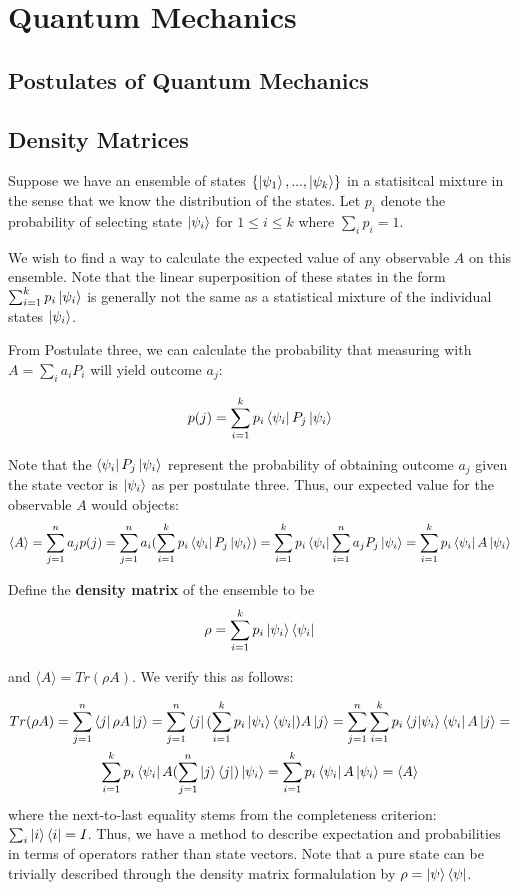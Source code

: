 \documentclass{../quantum.tex}
\begin{document}
\section{Quantum Mechanics}

\subsection{Postulates of Quantum Mechanics}

\subsection{Density Matrices}

Suppose we have an ensemble of states $\{\ket{\psi_1},...,\ket{\psi_k}\}$ in a statisitcal mixture in the sense that we know the distribution of the states. Let $p_i$ denote the probability of selecting state $\ket{\psi_i}$ for $1 \leq i \leq k$ where $\sum_i p_i = 1$.

We wish to find a way to calculate the expected value of any observable $A$ on this ensemble. Note that the linear superposition of these states in the form $\sum_{i=1}^k p_i \ket{\psi_i}$ is generally not the same as a statistical mixture of the individual states $\ket{\psi_i}$.

From Postulate three, we can calculate the probability that measuring with $A = \sum_i a_iP_i$ will yield outcome $a_j$:

$$ p(j) = \sum_{i=1}^k p_i \bra{\psi_i}P_j\ket{\psi_i} $$

Note that the $\bra{\psi_i}P_j\ket{\psi_i}$ represent the probability of obtaining outcome $a_j$ given the state vector is $\ket{\psi_i}$ as per postulate three. Thus, our expected value for the observable $A$ would objects:
$$ \langle A \rangle = \sum_{j=1}^n a_j p(j) = \sum_{j=1}^n a_i (\sum_{i=1}^k p_i \bra{\psi_i}P_j\ket{\psi_i}) = \sum_{i=1}^k p_i \bra{\psi_i}\sum_{i=1}^n a_j P_j\ket{\psi_i} = \sum_{i=1}^kp_i \bra{\psi_i}A\ket{\psi_i} $$

Define the {\bf density matrix} of the ensemble to be
$$ \rho = \sum_{i=1}^k p_i \ket{\psi_i}\bra{\psi_i} $$

and $\langle A \rangle = Tr(\rho A)$. We verify this as follows:

\begin{gather}
 Tr(\rho A) = \sum_{j=1}^n \bra{j}\rho A \ket{j} = \sum_{j=1}^n \bra{j} (\sum_{i=1}^k p_i\ket{\psi_i} \bra{\psi_i})A\ket{j} = \sum_{j=1}^n \sum_{i=1}^k p_i \bra{j}\ket{\psi_i}\bra{\psi_i}A\ket{j} = \\
 \sum_{i=1}^k p_i\bra{\psi_i}A(\sum_{j=1}^n \ket{j}\bra{j}) \ket{\psi_i} = \sum_{i=1}^k p_i \bra{\psi_i}A\ket{\psi_i} = \langle A \rangle
\end{gather}
where the next-to-last equality stems from the completeness criterion: $\sum_i \ket{i}\bra{i} = I$. Thus, we have a method to describe expectation and probabilities in terms of operators rather than state vectors. Note that a pure state can be trivially described through the density matrix formalulation by $\rho = \ket{\psi}\bra{\psi}$.
\end{document}
